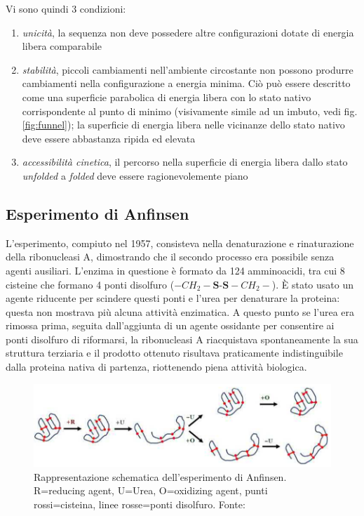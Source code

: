 Vi sono quindi 3 condizioni:

\begin{enumerate}
	\item \textit{unicità}, la sequenza non deve possedere altre configurazioni dotate di energia libera comparabile
	\item \textit{stabilità}, piccoli cambiamenti nell'ambiente circostante non possono produrre cambiamenti nella configurazione a energia minima. Ciò può essere descritto come una superficie parabolica di energia libera con lo stato nativo corrispondente al punto di minimo (visivamente simile ad un imbuto, vedi fig.\ref{fig:funnel}); la superficie di energia libera nelle vicinanze dello stato nativo deve essere abbastanza ripida ed elevata
	\item \textit{accessibilità cinetica}, il percorso nella superficie di energia libera dallo stato \textit{unfolded} a \textit{folded} deve essere ragionevolemente piano
\end{enumerate}


\subsection{Esperimento di Anfinsen}
L'esperimento, compiuto nel 1957\supercite{anfinsen1961kinetics}, consisteva nella denaturazione e rinaturazione della ribonucleasi A, dimostrando che il secondo processo era possibile senza agenti ausiliari. L'enzima in questione è formato da 124 amminoacidi, tra cui 8 cisteine che formano 4 ponti disolfuro ($-CH_{2}-\textbf{S-S}-CH_{2}-$). È stato usato un agente riducente per scindere questi ponti e l'urea per denaturare la proteina: questa non mostrava più alcuna attività enzimatica. A questo punto se l'urea era rimossa prima, seguita dall'aggiunta di un agente ossidante per consentire ai ponti disolfuro di riformarsi, la ribonucleasi A riacquistava spontaneamente la sua struttura terziaria e il prodotto ottenuto risultava praticamente indistinguibile dalla proteina nativa di partenza, riottenendo piena attività biologica. 

\begin{figure}[h]
	\centering
	\includegraphics[scale=0.6]{images/anfinsen-experiment.png}
	\caption{Rappresentazione schematica dell'esperimento di Anfinsen. R=reducing agent, U=Urea, O=oxidizing agent, punti rossi=cisteina, linee rosse=ponti disolfuro. Fonte: \cite{pal2019fundamentals}}
	\label{fig:anfinsen-exp}
\end{figure}

